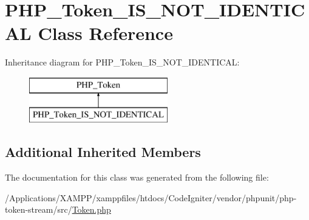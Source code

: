 \hypertarget{class_p_h_p___token___i_s___n_o_t___i_d_e_n_t_i_c_a_l}{}\section{P\+H\+P\+\_\+\+Token\+\_\+\+I\+S\+\_\+\+N\+O\+T\+\_\+\+I\+D\+E\+N\+T\+I\+C\+AL Class Reference}
\label{class_p_h_p___token___i_s___n_o_t___i_d_e_n_t_i_c_a_l}
Inheritance diagram for P\+H\+P\+\_\+\+Token\+\_\+\+I\+S\+\_\+\+N\+O\+T\+\_\+\+I\+D\+E\+N\+T\+I\+C\+AL\+:\begin{figure}[H]
\begin{center}
\leavevmode
\includegraphics[height=2.000000cm]{class_p_h_p___token___i_s___n_o_t___i_d_e_n_t_i_c_a_l}
\end{center}
\end{figure}
\subsection*{Additional Inherited Members}


The documentation for this class was generated from the following file\+:\begin{DoxyCompactItemize}
\item 
/\+Applications/\+X\+A\+M\+P\+P/xamppfiles/htdocs/\+Code\+Igniter/vendor/phpunit/php-\/token-\/stream/src/\mbox{\hyperlink{_token_8php}{Token.\+php}}\end{DoxyCompactItemize}
